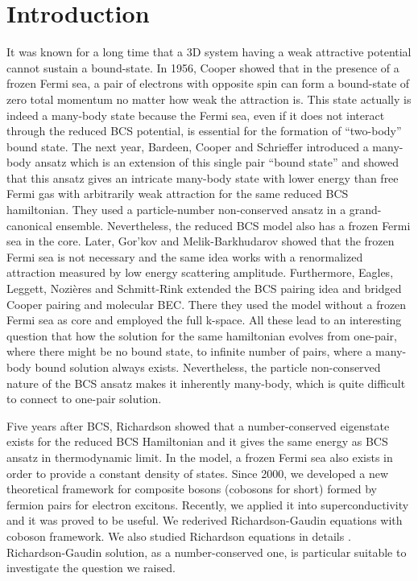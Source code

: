 \documentclass[3p,twocolumn]{elsarticle}
\begin{document}
\section{Introduction}
It was known for a long time that a 3D system having a weak attractive potential cannot sustain a bound-state.  In 1956, Cooper showed that in the presence of a frozen Fermi sea, a pair of electrons with opposite spin can form a bound-state of zero total momentum  no matter how weak the attraction is\cite{Cooper}.  This state actually is indeed a many-body state because the  Fermi sea, even if it does not interact through the reduced BCS potential,  is essential for the formation of ``two-body'' bound state.   The next year, Bardeen, Cooper and Schrieffer introduced a many-body ansatz which is an extension of this single pair ``bound state'' and showed that this ansatz gives an intricate many-body state with lower energy than free Fermi gas with arbitrarily weak attraction\cite{BCS} for the same reduced BCS hamiltonian.  They used a particle-number non-conserved ansatz in a grand-canonical ensemble.  Nevertheless, the reduced BCS model also has a frozen Fermi sea in the core. Later,   Gor'kov and Melik-Barkhudarov showed that the frozen Fermi sea is not necessary and the same idea works with a renormalized attraction measured by low energy scattering amplitude\cite{Gorkov}.   Furthermore, Eagles\cite{Eagle}, Leggett\cite{LeggettCrossover}, Nozi\`{e}res and Schmitt-Rink\cite{Nozieres} extended the BCS pairing idea and bridged Cooper pairing and molecular BEC. There they used the model without a frozen Fermi sea as core and employed the full k-space.  All these lead to an interesting question that how the solution for the same hamiltonian evolves from one-pair, where there might be no bound state, to infinite number of pairs, where a many-body bound solution always exists.  Nevertheless, the particle non-conserved nature of the BCS ansatz makes it inherently many-body, which is quite difficult to connect to one-pair solution.  

Five years after BCS, Richardson showed that a number-conserved eigenstate exists for the reduced BCS Hamiltonian and it gives the same energy as BCS ansatz in thermodynamic limit\cite{Richardson1,Richardson2,Richardson3,Richardson1968,gaudin}.  In the model, a frozen Fermi sea also exists in order to provide a constant density of states.  Since 2000, we developed a new theoretical framework for composite bosons (cobosons for short) formed by fermion pairs for electron excitons\cite{CobosonPhysicsReports}.   Recently, we applied it into superconductivity and it was proved to be useful.  We rederived Richardson-Gaudin equations with coboson framework\cite{CobosonBcsRich}. We also studied Richardson equations in details \cite{CombescotCooper,combescotBCS}.  Richardson-Gaudin solution, as a number-conserved one, is  particular suitable to investigate the question we raised.  
\end{document}
